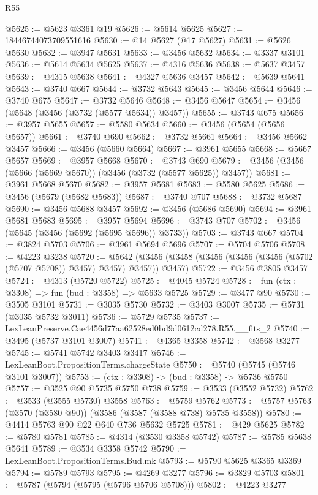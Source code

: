 \begin{lexlean}{R55}
\begin{coremodule}
@5625 := @5623 @3361 @19
@5626 := @5614 @5625
@5627 := 18446744073709551616
@5630 := @14 @5627 (@17 @5627)
@5631 := @5626 @5630
@5632 := @3947 @5631
@5633 := @3456 @5632
@5634 := @3337 @3101
@5636 := @5614 @5634 @5625
@5637 := @4316 @5636
@5638 := @5637 @3457
@5639 := @4315 @5638
@5641 := @4327 @5636 @3457
@5642 := @5639 @5641
@5643 := @3740 @667
@5644 := @3732 @5643
@5645 := @3456 @5644
@5646 := @3740 @675
@5647 := @3732 @5646
@5648 := @3456 @5647
@5654 := @3456 (@5648 (@3456 (@3732 (@5577 @5634)) @3457))
@5655 := @3743 @675
@5656 := @3957 @5655
@5657 := @5580 @5634
@5660 := @3456 (@5654 (@5656 @5657))
@5661 := @3740 @690
@5662 := @3732 @5661
@5664 := @3456 @5662 @3457
@5666 := @3456 (@5660 @5664)
@5667 := @3961 @5655
@5668 := @5667 @5657
@5669 := @3957 @5668
@5670 := @3743 @690
@5679 := @3456 (@3456 (@5666 (@5669 @5670)) (@3456 (@3732 (@5577 @5625)) @3457))
@5681 := @3961 @5668 @5670
@5682 := @3957 @5681
@5683 := @5580 @5625
@5686 := @3456 (@5679 (@5682 @5683))
@5687 := @3740 @707
@5688 := @3732 @5687
@5690 := @3456 @5688 @3457
@5692 := @3456 (@5686 @5690)
@5694 := @3961 @5681 @5683
@5695 := @3957 @5694
@5696 := @3743 @707
@5702 := @3456 (@5645 (@3456 (@5692 (@5695 @5696)) @3733))
@5703 := @3743 @667
@5704 := @3824 @5703
@5706 := @3961 @5694 @5696
@5707 := @5704 @5706
@5708 := @4223 @3238
@5720 := @5642 (@3456 (@3458 (@3456 (@3456 (@3456 (@5702 (@5707 @5708)) @3457) @3457) @3457)) @3457)
@5722 := @3456 @3805 @3457
@5724 := @4313 (@5720 @5722)
@5725 := @4045 @5724
@5728 := fun (ctx : @3308) => fun (bud : @3358) => @5633 @5725
@5729 := @3477 @90
@5730 := @3505 @3101
@5731 := @3035 @5730
@5732 := @3403 @3007
@5735 := @5731 (@3035 @5732 @3011)
@5736 := @5729 @5735
@5737 := LexLeanPreserve.Cae4456d77aa62528ed0bd9d0612cd278.R55.__fits_2
@5740 := @3495 (@5737 @3101 @3007)
@5741 := @4365 @3358
@5742 := @3568 @3277
@5745 := @5741 @5742 @3403 @3417
@5746 := LexLeanBoot.PropositionTerms.chargeState
@5750 := @5740 (@5745 (@5746 @3101 @3007))
@5753 := (ctx : @3308) -> (bud : @3358) -> @5736 @5750
@5757 := @3525 @90 @5735 @5750 @738
@5759 := @3533 (@3552 @5732)
@5762 := @3533 (@3555 @5730) @3558
@5763 := @5759 @5762
@5773 := @5757 @5763 (@3570 (@3580 @90)) (@3586 (@3587 (@3588 @738) @5735 @3558))
@5780 := @4414 @5763 @90 @22 @640 @736 @5632 @5725
@5781 := @429 @5625
@5782 := @5780 @5781
@5785 := @4314 (@3530 @3358 @5742)
@5787 := @5785 @5638 @5641
@5789 := @3534 @3358 @5742
@5790 := LexLeanBoot.PropositionTerms.Bud.mk
@5793 := @5790 @5625 @3365 @3369
@5794 := @5789 @5793
@5795 := @4269 @3277
@5796 := @3829 @5703
@5801 := @5787 (@5794 (@5795 (@5796 @5706 @5708)))
@5802 := @4223 @3277

\end{coremodule}
\end{lexlean}
